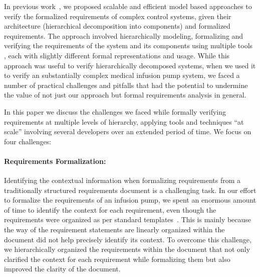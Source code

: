 In previous work~\cite{hilt2013, req2code, ICCPS2014}, we proposed scalable and efficient model based approaches to verify the formalized requirements of complex control systems, given their architecture (hierarchical decomposition into components) and formalized requirements. The approach involved hierarchically modeling, formalizing and verifying the requirements of the system and its components using multiple tools%
, each with slightly different formal representations and usage. While this approach was useful to verify hierarchically decomposed systems, when we used it to verify an substantially complex medical infusion pump system, we faced a number of practical challenges and pitfalls that had the potential to undermine the value of not just our approach but formal requirements analysis in general. %

In this paper we discuss the challenges we faced while formally verifying requirements at multiple levels of hierarchy, applying tools and techniques ``at scale'' involving several developers over an extended period of time.  We focus on four challenges:
\vspace{-0.15in}
\paragraph{\textbf{Requirements Formalization:}} Identifying the contextual information when formalizing requirements from a traditionally structured requirements document is a challenging task. In our effort to formalize the requirements of an infusion pump, we spent an enormous amount of time to identify the context for each requirement, even though the requirements were organized as per standard templates~\cite{IEEESRS}. This is mainly because the way of the requirement statements are linearly organized within the document did not help precisely identify its context. To overcome this challenge, we hierarchically organized the requirements within the document that not only clarified the context for each requirement while formalizing them but also improved the clarity of the document.
\vspace{-0.15in}
